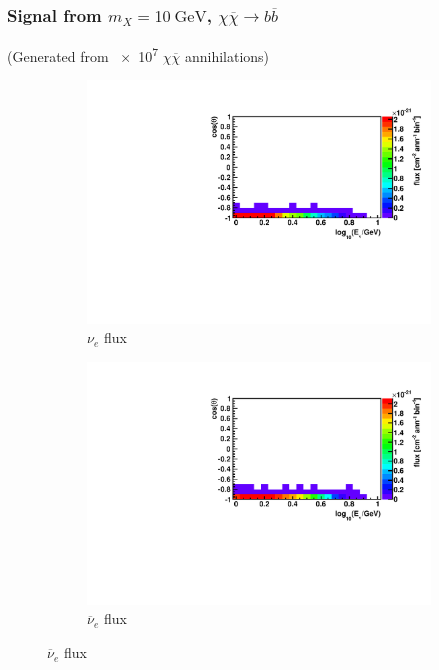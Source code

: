 \documentclass{beamer}
\begin{document}
\begin{frame}
	\frametitle{Signal from $m_X = \SI{10}{\giga\electronvolt}$,
		$\chi \overline{\chi} \rightarrow b \overline{b}$}
	(Generated from \num{e7} $\chi \overline{\chi}$ annihilations)
	\begin{figure}
		\centering
		\begin{subfigure}[b]{0.49\linewidth}
			\caption*{ $\nu_{e}$ flux }
			\includegraphics[width=\linewidth]{hist_flux_nue_from_10gev_mx_to_bbbar.pdf}
		\end{subfigure}
		\begin{subfigure}[b]{0.49\linewidth}
			\caption*{ $\overline{\nu}_{e}$ flux }
			\includegraphics[width=\linewidth]{hist_flux_nuebar_from_10gev_mx_to_bbbar.pdf}
		\end{subfigure}
	\end{figure}
\end{frame}
\end{document}
